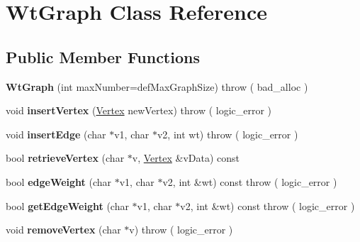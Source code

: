 \hypertarget{class_wt_graph}{\section{Wt\+Graph Class Reference}
\label{class_wt_graph}
}
\subsection*{Public Member Functions}
\begin{DoxyCompactItemize}
\item 
\hypertarget{class_wt_graph_a24922964bd1ddc86cef3ae0cc42d388d}{{\bfseries Wt\+Graph} (int max\+Number=def\+Max\+Graph\+Size)  throw ( bad\+\_\+alloc )}\label{class_wt_graph_a24922964bd1ddc86cef3ae0cc42d388d}

\item 
\hypertarget{class_wt_graph_a4ca3eb343548c81ca24fef7de7536437}{void {\bfseries insert\+Vertex} (\hyperlink{class_vertex}{Vertex} new\+Vertex)  throw ( logic\+\_\+error )}\label{class_wt_graph_a4ca3eb343548c81ca24fef7de7536437}

\item 
\hypertarget{class_wt_graph_aea0e33832423083bd5d532dc04ca1dff}{void {\bfseries insert\+Edge} (char $\ast$v1, char $\ast$v2, int wt)  throw ( logic\+\_\+error )}\label{class_wt_graph_aea0e33832423083bd5d532dc04ca1dff}

\item 
\hypertarget{class_wt_graph_aee1b743d73b67a832e30c8603c9f2a0e}{bool {\bfseries retrieve\+Vertex} (char $\ast$v, \hyperlink{class_vertex}{Vertex} \&v\+Data) const }\label{class_wt_graph_aee1b743d73b67a832e30c8603c9f2a0e}

\item 
\hypertarget{class_wt_graph_ac20ca5b112adb5403f50caf99e4ee8bd}{bool {\bfseries edge\+Weight} (char $\ast$v1, char $\ast$v2, int \&wt) const   throw ( logic\+\_\+error )}\label{class_wt_graph_ac20ca5b112adb5403f50caf99e4ee8bd}

\item 
\hypertarget{class_wt_graph_afa768b2bfd49e68c1970e479cab00036}{bool {\bfseries get\+Edge\+Weight} (char $\ast$v1, char $\ast$v2, int \&wt) const   throw ( logic\+\_\+error )}\label{class_wt_graph_afa768b2bfd49e68c1970e479cab00036}

\item 
\hypertarget{class_wt_graph_aaabd4ba894d1c4251479837b1d0a0a78}{void {\bfseries remove\+Vertex} (char $\ast$v)  throw ( logic\+\_\+error )}\label{class_wt_graph_aaabd4ba894d1c4251479837b1d0a0a78}


\end{DoxyCompactItemize}
